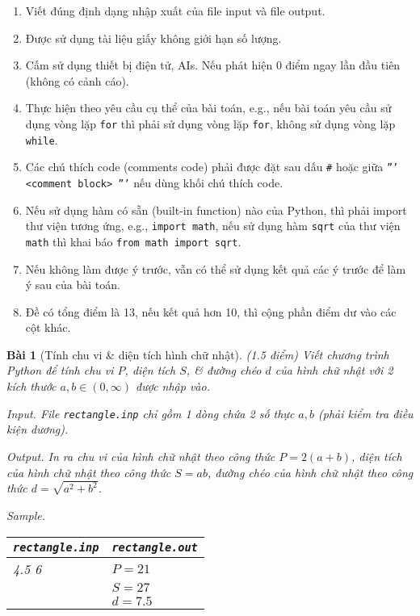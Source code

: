 \documentclass{article}
\newtheorem{baitoan}{Bài}
\begin{document}
\begin{enumerate}
	\item Viết đúng định dạng nhập xuất của file input và file output.
	\item Được sử dụng tài liệu giấy không giới hạn số lượng.
	\item Cấm sử dụng thiết bị điện tử, AIs. Nếu phát hiện 0 điểm ngay lần đầu tiên (không có cảnh cáo).
	\item Thực hiện theo yêu cầu cụ thể của bài toán, e.g., nếu bài toán yêu cầu sử dụng vòng lặp {\tt for} thì phải sử dụng vòng lặp {\tt for}, không sử dụng vòng lặp {\tt while}.
	\item Các chú thích code (comments code) phải được đặt sau dấu {\tt\#} hoặc giữa {\tt''' <comment block> '''} nếu dùng khối chú thích code.
	\item Nếu sử dụng hàm có sẵn (built-in function) nào của Python, thì phải import thư viện tương ứng, e.g., {\tt import math}, nếu sử dụng hàm {\tt sqrt} của thư viện {\tt math} thì khai báo {\tt from math import sqrt}.
	\item Nếu không làm được ý trước, vẫn có thể sử dụng kết quả các ý trước để làm ý sau của bài toán.
	\item Đề có tổng điểm là 13, nếu kết quả hơn 10, thì cộng phần điểm dư vào các cột khác.
\end{enumerate}

\begin{baitoan}[Tính chu vi \& diện tích hình chữ nhật]
	{\rm(1.5 điểm)} Viết chương trình Python để tính chu vi $P$, diện tích $S$, \& đường chéo $d$ của hình chữ nhật với 2 kích thước $a,b\in(0,\infty)$ được nhập vào.
	\item {\sf Input.} File {\tt rectangle.inp} chỉ gồm 1 dòng chứa 2 số thực $a,b$ (phải kiểm tra điều kiện dương).
	\item {\sf Output.} In ra chu vi của hình chữ nhật theo công thức $P = 2(a + b)$, diện tích của hình chữ nhật theo công thức $S = ab$, đường chéo của hình chữ nhật theo công thức $d = \sqrt{a^2 + b^2}$.
	\item {\sf Sample.}
	\begin{table}[H]
		\centering
		\begin{tabular}{|l|l|}
			\hline
			\verb|rectangle.inp| & \verb|rectangle.out| \\
			\hline
			4.5 6 & $P = 21$ \\
            & $S = 27$ \\
            & $d = 7.5$ \\
			\hline
		\end{tabular}
	\end{table}
\end{baitoan}
\end{document}
